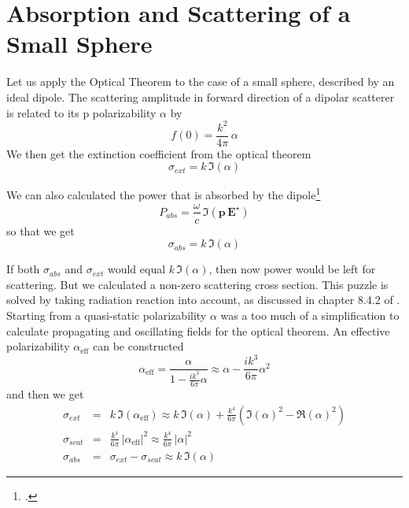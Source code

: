 \section{Absorption and Scattering of a Small Sphere}

Let us apply the Optical Theorem to the case of a small sphere, described by an ideal dipole.
The scattering amplitude in forward direction of a dipolar scatterer is related to its p polarizability $\alpha$ by 
\begin{equation}
 f(0) = \frac{k^2}{4 \pi} \, \alpha
\end{equation}
We  then get the extinction coefficient from the optical theorem
\begin{equation}
 \sigma_{ext} = k \, \Im ( \alpha )
\end{equation}

We can also calculated the power that is absorbed by the dipole\footcite[Chapter 8]{Novotny-Hecht2012}
\begin{equation}
 P_{abs} = \frac{\omega}{c} \, \Im \left( \mathbf{p} \, \mathbf{E}^\star \right) 
\end{equation}
so that we get 
\begin{equation}
 \sigma_{abs} = k \, \Im ( \alpha )
\end{equation}

If both $\sigma_{abs}$ and $\sigma_{ext}$  would equal $ k \, \Im ( \alpha )$, then now power would be left for scattering. But we calculated a non-zero scattering cross section. 
This puzzle is solved by taking radiation reaction into account, as discussed in chapter 8.4.2 of \cite{Novotny-Hecht2012}. Starting from a quasi-static polarizability $\alpha$ was a too much of a simplification to calculate propagating and oscillating fields  for the optical theorem. An effective  polarizability $\alpha_{\text{eff}}$ can be constructed 
\begin{equation}
 \alpha_{\text{eff}} = \frac{\alpha}{1 - \frac{i k^3 }{6 \pi} \alpha}
 \approx \alpha  - \frac{i k^3 }{6 \pi} \alpha^2
\end{equation}
and then we get
\begin{eqnarray}
 \sigma_{ext} &= & k \, \Im ( \alpha_{\text{eff}}  ) \approx 
 k \, \Im ( \alpha  )  + \frac{k^4}{6 \pi} \left( \Im (\alpha)^2 - \Re (\alpha)^2 \right) \\
  \sigma_{scat} & = &  \frac{k^4}{6 \pi }  \, |\alpha_{\text{eff}} |^2  \approx  \frac{k^4}{6 \pi }  \, |\alpha |^2 \\
   \sigma_{abs} &=&  \sigma_{ext} - \sigma_{scat} \approx  k \, \Im ( \alpha  ) 
\end{eqnarray}



